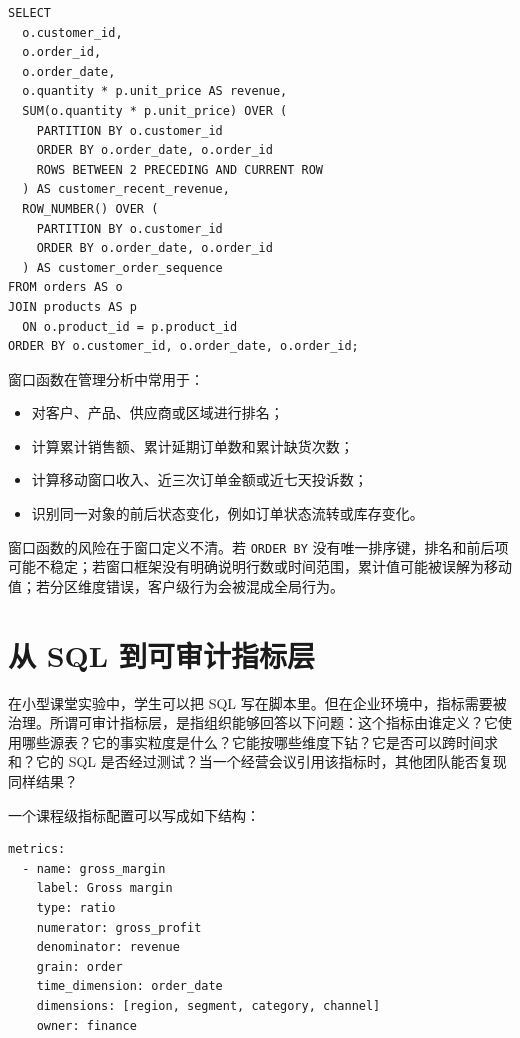 \documentclass[UTF8,fontset=fandol,openany,zihao=-4]{ctexbook}
\begin{document}
\begin{lstlisting}[caption={客户最近三笔订单收入}]
SELECT
  o.customer_id,
  o.order_id,
  o.order_date,
  o.quantity * p.unit_price AS revenue,
  SUM(o.quantity * p.unit_price) OVER (
    PARTITION BY o.customer_id
    ORDER BY o.order_date, o.order_id
    ROWS BETWEEN 2 PRECEDING AND CURRENT ROW
  ) AS customer_recent_revenue,
  ROW_NUMBER() OVER (
    PARTITION BY o.customer_id
    ORDER BY o.order_date, o.order_id
  ) AS customer_order_sequence
FROM orders AS o
JOIN products AS p
  ON o.product_id = p.product_id
ORDER BY o.customer_id, o.order_date, o.order_id;
\end{lstlisting}

窗口函数在管理分析中常用于：
\begin{itemize}
  \item 对客户、产品、供应商或区域进行排名；
  \item 计算累计销售额、累计延期订单数和累计缺货次数；
  \item 计算移动窗口收入、近三次订单金额或近七天投诉数；
  \item 识别同一对象的前后状态变化，例如订单状态流转或库存变化。
\end{itemize}

窗口函数的风险在于窗口定义不清。若 \texttt{ORDER BY} 没有唯一排序键，排名和前后项可能不稳定；若窗口框架没有明确说明行数或时间范围，累计值可能被误解为移动值；若分区维度错误，客户级行为会被混成全局行为。

\section{从 SQL 到可审计指标层}

在小型课堂实验中，学生可以把 SQL 写在脚本里。但在企业环境中，指标需要被治理。所谓可审计指标层，是指组织能够回答以下问题：这个指标由谁定义？它使用哪些源表？它的事实粒度是什么？它能按哪些维度下钻？它是否可以跨时间求和？它的 SQL 是否经过测试？当一个经营会议引用该指标时，其他团队能否复现同样结果？

一个课程级指标配置可以写成如下结构：

\begin{lstlisting}[caption={指标配置示例}]
metrics:
  - name: gross_margin
    label: Gross margin
    type: ratio
    numerator: gross_profit
    denominator: revenue
    grain: order
    time_dimension: order_date
    dimensions: [region, segment, category, channel]
    owner: finance
\end{lstlisting}
\end{document}
